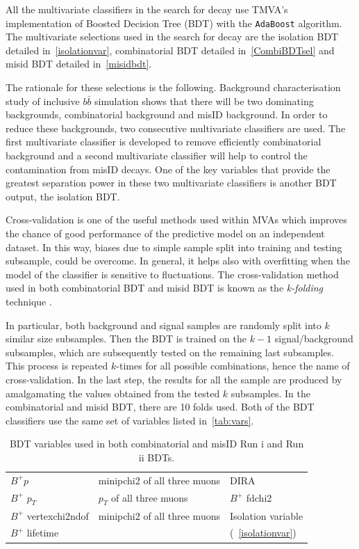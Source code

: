 All the multivariate classifiers in the search for \Bmumumu decay use TMVA's \cite{Speckmayer:2010zz} implementation of Boosted Decision Tree (BDT) with the \texttt{AdaBoost} algorithm. The multivariate selections used in the search for \Bmumumu decay are the isolation BDT detailed in~\autoref{isolationvar}, combinatorial BDT detailed in~\autoref{CombiBDTsel} and misid BDT detailed in~\autoref{misidbdt}.

The rationale for these selections is the following. Background characterisation study of inclusive $b\bar{b}$ simulation shows that there will be two dominating backgrounds, combinatorial background and misID background. In order to reduce these backgrounds, two consecutive multivariate classifiers are used. The first multivariate classifier is developed to remove efficiently combinatorial background and a second multivariate classifier will help to control the contamination from misID decays. One of the key variables that provide the greatest separation power in these two multivariate classifiers is another BDT output, the isolation BDT.

Cross-validation is one of the useful methods used within MVAs which improves the chance of good performance of the predictive model on an independent dataset. In this way, biases due to simple sample split into training and testing subsample, could be overcome. In general, it helps also with overfitting when the model of the classifier is sensitive to fluctuations.  The cross-validation method used in both combinatorial BDT and misid BDT is known as the \textit{k-folding} technique \cite{kfold}. 

In particular, both background and signal samples are randomly split into $k$ similar size subsamples. Then the BDT is trained on the $k-1$ signal/background subsamples, which are subsequently tested on the remaining last subsamples. This process is repeated $k$-times for all possible combinations, hence the name of cross-validation. In the last step, the results for all the sample are produced by amalgamating the values obtained from the tested $k$ subsamples. In the combinatorial and misid BDT, there are 10 folds used. Both of the BDT classifiers use the same set of variables listed in~\autoref{tab:vars}.

\begin{table}[h!]
\begin{center}
\begin{tabular}{| l  l  l |} \hline
$B^{+} p$ & \gls{minipchi2} of all three muons & \gls{DIRA} \\
$B^{+}$ $p_T$ & $p_{T}$ of all three muons & $B^{+}$ \gls{fdchi2} \\ 
$B^{+}$ \gls{vertexchi2ndof} & \gls{minipchi2} of all three muons  & Isolation variable \\
	$B^{+}$ lifetime &  & (~\autoref{isolationvar}) \\ \hline
\end{tabular}
\end{center}
\caption{BDT variables used in both combinatorial and misID Run \Rn{1} and Run \Rn{2} BDTs.}
\label{tab:vars}
\end{table}



